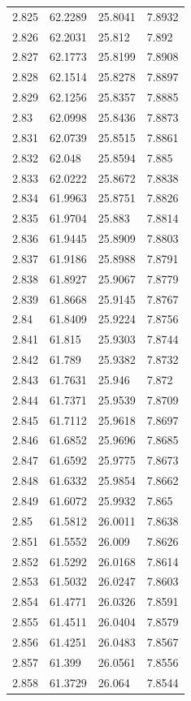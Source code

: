 \begin{tabular}{llll}
2.825 & 62.2289 & 25.8041 & 7.8932 \\
2.826 & 62.2031 & 25.812 & 7.892 \\
2.827 & 62.1773 & 25.8199 & 7.8908 \\
2.828 & 62.1514 & 25.8278 & 7.8897 \\
2.829 & 62.1256 & 25.8357 & 7.8885 \\
2.83 & 62.0998 & 25.8436 & 7.8873 \\
2.831 & 62.0739 & 25.8515 & 7.8861 \\
2.832 & 62.048 & 25.8594 & 7.885 \\
2.833 & 62.0222 & 25.8672 & 7.8838 \\
2.834 & 61.9963 & 25.8751 & 7.8826 \\
2.835 & 61.9704 & 25.883 & 7.8814 \\
2.836 & 61.9445 & 25.8909 & 7.8803 \\
2.837 & 61.9186 & 25.8988 & 7.8791 \\
2.838 & 61.8927 & 25.9067 & 7.8779 \\
2.839 & 61.8668 & 25.9145 & 7.8767 \\
2.84 & 61.8409 & 25.9224 & 7.8756 \\
2.841 & 61.815 & 25.9303 & 7.8744 \\
2.842 & 61.789 & 25.9382 & 7.8732 \\
2.843 & 61.7631 & 25.946 & 7.872 \\
2.844 & 61.7371 & 25.9539 & 7.8709 \\
2.845 & 61.7112 & 25.9618 & 7.8697 \\
2.846 & 61.6852 & 25.9696 & 7.8685 \\
2.847 & 61.6592 & 25.9775 & 7.8673 \\
2.848 & 61.6332 & 25.9854 & 7.8662 \\
2.849 & 61.6072 & 25.9932 & 7.865 \\
2.85 & 61.5812 & 26.0011 & 7.8638 \\
2.851 & 61.5552 & 26.009 & 7.8626 \\
2.852 & 61.5292 & 26.0168 & 7.8614 \\
2.853 & 61.5032 & 26.0247 & 7.8603 \\
2.854 & 61.4771 & 26.0326 & 7.8591 \\
2.855 & 61.4511 & 26.0404 & 7.8579 \\
2.856 & 61.4251 & 26.0483 & 7.8567 \\
2.857 & 61.399 & 26.0561 & 7.8556 \\
2.858 & 61.3729 & 26.064 & 7.8544 \\

\end{tabular}
